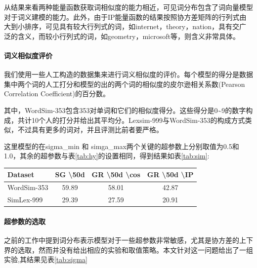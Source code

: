 \documentclass[a4paper,13pt]{article}
\begin{document}
\begin{spacing}{1.5}
\begin{center}
\end{center}
从结果来看两种能量函数获取词相似度的能力相近，可见词分布包含了词向量模型对于词义建模的能力。此外，由于IP能量函数的结果按照协方差矩阵的行列式由大到小排序，可见具有较大行列式的词，如internet，theory，nation，具有交广泛的含义，而较小行列式的词，如geometry，microsoft等，则含义非常具体。

\paragraph{词义相似度评价}
我们使用一些人工构造的数据集来进行词义相似度的评价。每个模型的得分是数据集中两个词的人工打分和模型的出的两个词的相似度的皮尔逊相关系数(Pearson Correlation Coefficient)的百分数。

其中，WordSim-353包含353对单词和它们的相似度得分。这些得分是0\~{}9的数字构成，共计10个人的打分并给出其平均分。Lexsim-999与WordSim-353的构成方式类似，不过具有更多的词对，并且评测比前者要严格。

这里模型的在sigma\_min 和 simga\_max两个关键的超参数上分别取值为0.5和1.0，其余的超参数与表\ref{tab:hy}的设置相同，得到结果如表\ref{tab:sim}:

\begin{center}
\begin{tabular}{| l | c | c | c |}
\hline
\textbf{Dataset} & \textbf{SG \textbackslash 50d} & \textbf{GR \textbackslash 50d \textbackslash cos} & \textbf{GR \textbackslash 50d \textbackslash IP} \\
\hline
WordSim-353 & 59.89 & 58.01 & 42.87 \\
\hline
SimLex-999 & 29.39 & 27.59 & 20.91 \\
\hline
\end{tabular}
\label{tab:sim}
\end{center}

\paragraph{超参数的选取}之前的工作中提到词分布表示模型对于一些超参数非常敏感，尤其是协方差的上下界的选取，然而并没有给出相应的实验和取值策略。本文针对这一问题给出了一组实验,其结果见表\ref{tab:sigma}


\end{spacing}
\end{document}
